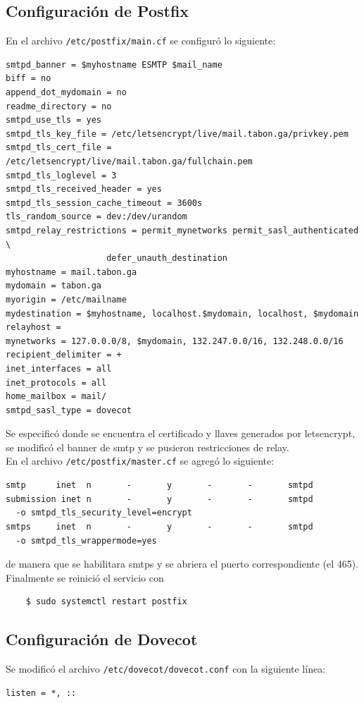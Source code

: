 \documentclass[9pt]{article}
\begin{document}
\subsection{Configuración de Postfix}
En el archivo \texttt{/etc/postfix/main.cf} se configuró lo siguiente:
\begin{verbatim}
smtpd_banner = $myhostname ESMTP $mail_name         
biff = no
append_dot_mydomain = no
readme_directory = no
smtpd_use_tls = yes
smtpd_tls_key_file = /etc/letsencrypt/live/mail.tabon.ga/privkey.pem
smtpd_tls_cert_file = /etc/letsencrypt/live/mail.tabon.ga/fullchain.pem
smtpd_tls_loglevel = 3
smtpd_tls_received_header = yes
smtpd_tls_session_cache_timeout = 3600s
tls_random_source = dev:/dev/urandom
smtpd_relay_restrictions = permit_mynetworks permit_sasl_authenticated \
                    defer_unauth_destination
myhostname = mail.tabon.ga                              
mydomain = tabon.ga
myorigin = /etc/mailname
mydestination = $myhostname, localhost.$mydomain, localhost, $mydomain
relayhost = 
mynetworks = 127.0.0.0/8, $mydomain, 132.247.0.0/16, 132.248.0.0/16
recipient_delimiter = +
inet_interfaces = all
inet_protocols = all
home_mailbox = mail/
smtpd_sasl_type = dovecot
\end{verbatim}
Se especificó donde se encuentra el certificado y llaves generados por \textsf{letsencrypt}, se modificó el banner de \textsf{smtp} y se pusieron restricciones de relay. \\
En el archivo \texttt{/etc/postfix/master.cf} se agregó lo siguiente:
\begin{verbatim}
smtp      inet  n       -       y       -       -       smtpd
submission inet n       -       y       -       -       smtpd
  -o smtpd_tls_security_level=encrypt
smtps     inet  n       -       y       -       -       smtpd
  -o smtpd_tls_wrappermode=yes
\end{verbatim}
de manera que se habilitara \textsf{smtps} y se abriera el puerto correspondiente (el 465). Finalmente se reinició el servicio con
\begin{verbatim}
    $ sudo systemctl restart postfix
\end{verbatim}

\subsection{Configuración de Dovecot}

Se modificó el archivo \texttt{/etc/dovecot/dovecot.conf} con la siguiente línea:
\begin{verbatim}
listen = *, ::
\end{verbatim}
\end{document}
